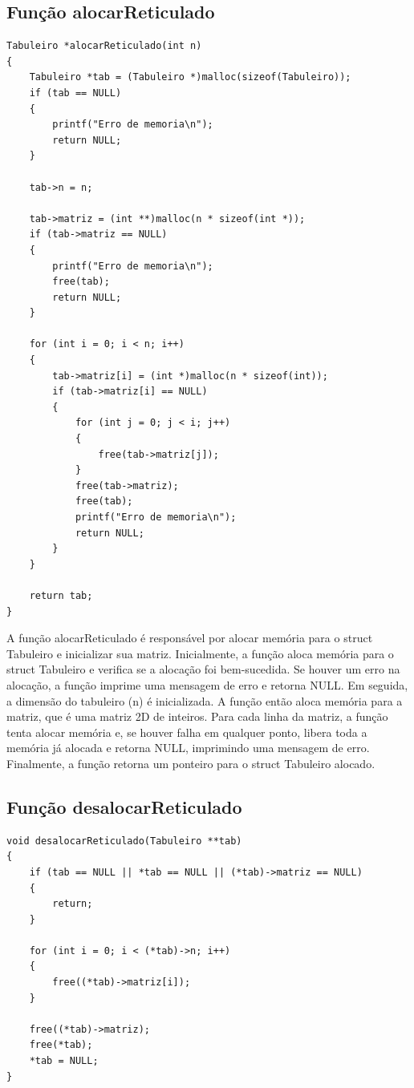 \documentclass{article}
\begin{document}
 \subsection{Função alocarReticulado}
\begin{lstlisting}[caption={},label={lst:cod1},language={[x86masm]Assembler}]
Tabuleiro *alocarReticulado(int n)
{
    Tabuleiro *tab = (Tabuleiro *)malloc(sizeof(Tabuleiro));
    if (tab == NULL)
    {
        printf("Erro de memoria\n");
        return NULL;
    }

    tab->n = n;

    tab->matriz = (int **)malloc(n * sizeof(int *));
    if (tab->matriz == NULL)
    {
        printf("Erro de memoria\n");
        free(tab);
        return NULL;
    }

    for (int i = 0; i < n; i++)
    {
        tab->matriz[i] = (int *)malloc(n * sizeof(int));
        if (tab->matriz[i] == NULL)
        {
            for (int j = 0; j < i; j++)
            {
                free(tab->matriz[j]);
            }
            free(tab->matriz);
            free(tab);
            printf("Erro de memoria\n");
            return NULL;
        }
    }

    return tab;
}
 \end{lstlisting}

 \par A função alocarReticulado é responsável por alocar memória para o struct Tabuleiro e inicializar sua matriz. Inicialmente, a função aloca memória para o struct Tabuleiro e verifica se a alocação foi bem-sucedida. Se houver um erro na alocação, a função imprime uma mensagem de erro e retorna NULL. Em seguida, a dimensão do tabuleiro (n) é inicializada. A função então aloca memória para a matriz, que é uma matriz 2D de inteiros. Para cada linha da matriz, a função tenta alocar memória e, se houver falha em qualquer ponto, libera toda a memória já alocada e retorna NULL, imprimindo uma mensagem de erro. Finalmente, a função retorna um ponteiro para o struct Tabuleiro alocado.

\subsection{Função desalocarReticulado}

\begin{lstlisting}[caption={},label={lst:cod1},language={[x86masm]Assembler}]
void desalocarReticulado(Tabuleiro **tab)
{
    if (tab == NULL || *tab == NULL || (*tab)->matriz == NULL)
    {
        return;
    }

    for (int i = 0; i < (*tab)->n; i++)
    {
        free((*tab)->matriz[i]);
    }

    free((*tab)->matriz);
    free(*tab);
    *tab = NULL;
}

 \end{lstlisting}
\end{document}
